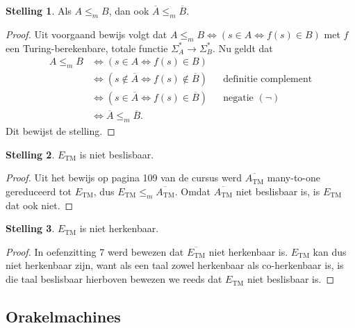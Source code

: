 \documentclass[kulak]{kulakarticle}
\theoremstyle{definition}
\newtheorem*{stelling}{Stelling}
\begin{document}
	\begin{stelling}
		Als \(A \leq_m B\), dan ook \(\overline{A} \leq_m \overline{B}\).
	\end{stelling}

	\begin{proof}
		Uit voorgaand bewijs volgt dat \(A \leq_m B \Leftrightarrow (s\in A \Leftrightarrow f(s)\in B)\) met \( f \) een Turing-berekenbare, totale functie \(\Sigma_A^*\to\Sigma_B^*\). Nu geldt dat \begin{align*}
			A \leq_m B & \Leftrightarrow (s\in A \Leftrightarrow f(s)\in B) \\
			& \Leftrightarrow (s\notin \overline{A} \Leftrightarrow f(s)\notin \overline{B}) && \text{definitie complement} \\
			& \Leftrightarrow (s\in \overline{A} \Leftrightarrow f(s)\in \overline{B}) && \text{negatie } (\neg) \\
			& \Leftrightarrow \overline{A} \leq_m \overline{B}.
		\end{align*}
		Dit bewijst de stelling.
	\end{proof}

	\begin{stelling}
		\(E_\text{TM}\) is niet beslisbaar.
	\end{stelling}

	\begin{proof}
		Uit het bewijs op pagina 109 van de cursus werd \(\overline{A_\text{TM}}\) many-to-one gereduceerd tot \(E_\text{TM}\), dus \(E_\text{TM} \leq_m \overline{A_\text{TM}}\). Omdat \(\overline{A_\text{TM}}\) niet beslisbaar is, is \(E_\text{TM}\) dat ook niet.
	\end{proof}

	\begin{stelling}
		\(E_\text{TM}\) is niet herkenbaar.
	\end{stelling}

	\begin{proof}
		In oefenzitting 7 werd bewezen dat \(\overline{E_\text{TM}}\) niet herkenbaar is. \(E_\text{TM}\) kan dus niet herkenbaar zijn, want als een taal zowel herkenbaar als co-herkenbaar is, is die taal beslisbaar hierboven bewezen we reeds dat \(E_\text{TM}\) niet beslisbaar is.
	\end{proof}

	\subsection{Orakelmachines}
\end{document}
